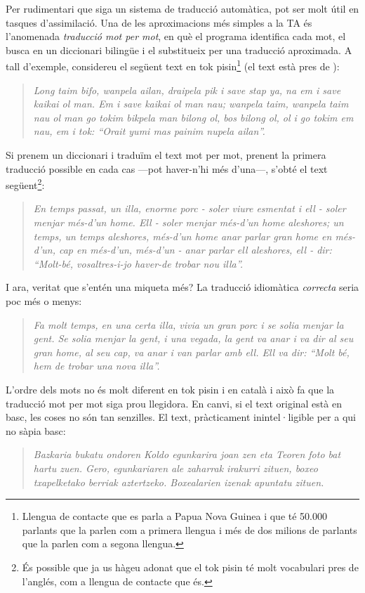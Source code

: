 Per rudimentari que siga un sistema de traducció automàtica, pot ser
molt útil en tasques d'assimilació. Una de les aproximacions més
simples a la TA és l'anomenada \emph{traducció mot per
mot}\label{pg:mpm}, en què el programa
identifica cada mot, el busca en un diccionari bilingüe i el substitueix
per una traducció aproximada. A tall d'exemple, considereu el
següent text en tok pisin\footnote{Llengua 
de contacte que es parla a Papua Nova Guinea i que té 50.000 parlants
que la parlen com a primera llengua i més de dos milions de parlants 
que la parlen com a segona llengua.} (el text està pres de \citealt{lyovin97b}):
\begin{quote}{\sl
Long taim bifo, wanpela ailan, draipela pik i save stap ya, na em i save
kaikai ol man. Em i save kaikai ol man nau; wanpela taim, wanpela taim nau
ol man go tokim bikpela man bilong ol, bos bilong ol, ol i go tokim em nau,
em i tok: ``Orait yumi mas painim nupela ailan''. }
\end{quote} 
Si prenem un diccionari i traduïm el text mot per mot, prenent la
primera traducció possible en cada cas ---pot haver-n'hi més d'una---,
s'obté el text següent\footnote{És possible que ja us hàgeu
adonat que el tok pisin té molt vocabulari pres de l'anglés, com a
llengua de contacte que és.}:
\begin{quote}{\sl
En temps passat, un illa, enorme porc - soler viure esmentat i ell - soler menjar
més-d'un home. Ell - soler menjar més-d'un home aleshores; un temps,
un temps aleshores, més-d'un home anar parlar gran home en més-d'un,
cap en més-d'un,
més-d'un - anar parlar ell aleshores, ell - dir: ``Molt-bé,
vosaltres-i-jo haver-de trobar nou illa''.}
\end{quote}
I ara, veritat que s'entén una miqueta més? La traducció
idiomàtica \emph{correcta} seria poc més o menys:
\begin{quote}{\sl
Fa molt temps, en una certa illa, vivia un gran porc i se solia menjar la
gent. Se solia menjar la gent, i una vegada, la gent va anar i va dir al seu
gran home, al seu cap, va anar i van parlar amb ell. Ell va dir: ``Molt
bé, hem de trobar una nova illa''.}
\end{quote}
L'ordre dels mots no és molt diferent en tok
pisin i en català i això fa que la traducció mot per mot siga
prou llegidora. En canvi, si el text original està en basc,
les coses no són
tan senzilles. El text, pràcticament inintel·ligible per a qui no sàpia
basc:
\begin{quote}{\sl
Bazkaria bukatu ondoren Koldo egunkarira joan zen eta Teoren foto bat
hartu zuen. Gero, egunkariaren ale zaharrak irakurri zituen, boxeo
txapelketako berriak aztertzeko. Boxealarien izenak apuntatu zituen.}
\end{quote}

